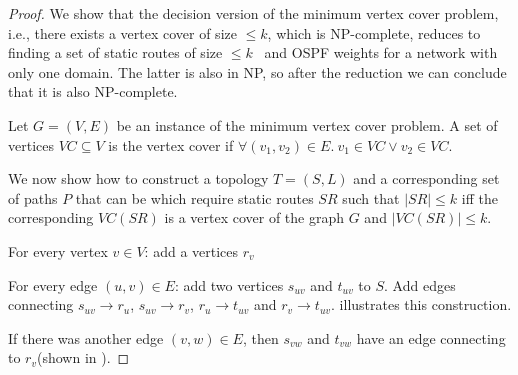 \begin{proof}
We show that the decision version of the minimum 
vertex cover problem, i.e., there exists a vertex cover
of size $ \leq k$, which is NP-complete, 
reduces to finding a set of static routes 
of size $ \leq k$ \
and OSPF weights for a network with only one domain. 
The latter is also in NP, so after the reduction we 
can conclude that it is also NP-complete.

Let $G = (V,E)$ be an instance of the 
minimum vertex cover problem. A set of
vertices $VC \subseteq V$ is the vertex cover
if $\forall (v_1, v_2) \in E. ~v_1 \in VC \vee v_2 \in VC$. 

We now show how to construct a topology $T=(S,L)$ 
and a corresponding set of paths $P$ that can be 
which require static routes $SR$ such that $|SR| \leq k$  
iff the corresponding $VC(SR)$ is a vertex cover of 
the graph $G$ and $|VC(SR)| \leq k$.

For every vertex $v \in V$: add a vertices $r_v$ 

For every edge $(u,v) \in E$: add two vertices $s_{uv}$
and $t_{uv}$ to $S$. Add edges
connecting $s_{uv} \rightarrow r_{u}$, $s_{uv} \rightarrow r_{v}$,
$r_{u} \rightarrow t_{uv}$ and $r_{v} \rightarrow t_{uv}$. 
 illustrates this construction.
\begin{figure}[H]
	\centering
	\label{fig:rfcomplexity}
\end{figure}
If there was another edge $(v,w) \in E$, then
$s_{vw}$ and $t_{vw}$ have an edge connecting to $r_v$(shown
in ). 


\end{proof}
